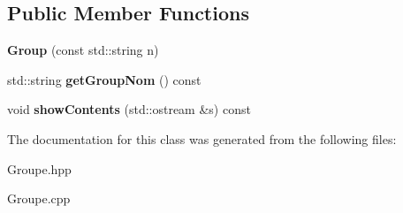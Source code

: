 \subsection*{Public Member Functions}
\begin{DoxyCompactItemize}
\item 
\mbox{\label{class_group_a471ecffa64b4ed9be47e03698638e80b}} 
{\bfseries Group} (const std\+::string n)
\item 
\mbox{\label{class_group_a23af4e0890598cc5594be746ef9579c6}} 
std\+::string {\bfseries get\+Group\+Nom} () const
\item 
\mbox{\label{class_group_af43f52e32620e61bb048cb390531f45b}} 
void {\bfseries show\+Contents} (std\+::ostream \&s) const
\end{DoxyCompactItemize}


The documentation for this class was generated from the following files\+:\begin{DoxyCompactItemize}
\item 
Groupe.\+hpp\item 
Groupe.\+cpp\end{DoxyCompactItemize}
